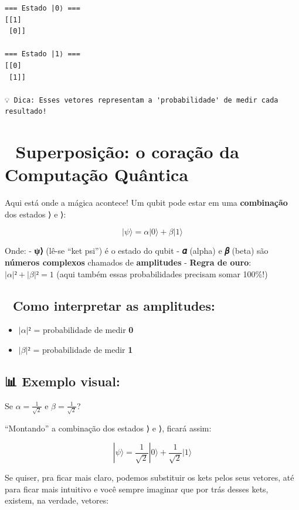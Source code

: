 \documentclass[
  brazilian,
]{report}
\providecommand{\tightlist}{%
  \setlength{\itemsep}{0pt}\setlength{\parskip}{0pt}}
\begin{document}
\begin{verbatim}
=== Estado |0⟩ ===
[[1]
 [0]]

=== Estado |1⟩ ===
[[0]
 [1]]

💡 Dica: Esses vetores representam a 'probabilidade' de medir cada resultado!
\end{verbatim}

\section{🌟 Superposição: o coração da Computação
Quântica}\label{superposiuxe7uxe3o-o-corauxe7uxe3o-da-computauxe7uxe3o-quuxe2ntica}

Aqui está onde a mágica acontece! Um qubit pode estar em uma
\textbf{combinação} dos estados ⟩ e ⟩:

\[|ψ⟩ = 𝛼|0⟩ + 𝛽|1⟩\]

Onde: - \textbf{\textbar ψ⟩} (lê-se ``ket psi'') é o estado do qubit -
\textbf{𝛼} (alpha) e \textbf{𝛽} (beta) são \textbf{números complexos}
chamados de \textbf{amplitudes} - \textbf{Regra de ouro}:
\(|𝛼|² + |𝛽|²= 1\) (aqui também essas probabilidades precisam somar
100\%!)

\subsection{🎲 Como interpretar as
amplitudes:}\label{como-interpretar-as-amplitudes}

\begin{itemize}
\tightlist
\item
  \(|𝛼|²\) = probabilidade de medir \textbf{0}
\item
  \(|𝛽|²\) = probabilidade de medir \textbf{1}
\end{itemize}

\subsection{📊 Exemplo visual:}\label{exemplo-visual}

Se \(𝛼 = \frac{1}{\sqrt{2}}\) e \(𝛽 = \frac{1}{\sqrt{2}}\)?

``Montando'' a combinação dos estados ⟩ e ⟩, ficará
assim:

\[|ψ⟩ = \frac{1}{\sqrt{2}}|0⟩ + \frac{1}{\sqrt{2}}|1⟩\]

Se quiser, pra ficar mais claro, podemos substituir os kets pelos seus
vetores, até para ficar mais intuitivo e você sempre imaginar que por
trás desses kets, existem, na verdade, vetores:
\end{document}
